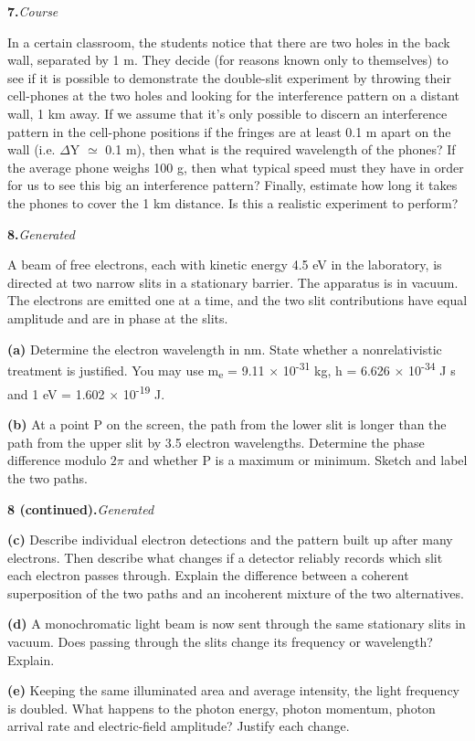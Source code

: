 \documentclass[12pt,letterpaper]{article}
\newcommand{\question}[2]{\noindent\textbf{#1.}\hfill\textit{#2}\par\medskip}
\begin{document}
\newpage

\question{7}{Course}

In a certain classroom, the students notice that there are two holes in the back wall, separated by 1 m. They decide (for reasons known only to themselves) to see if it is possible to demonstrate the double-slit experiment by throwing their cell-phones at the two holes and looking for the interference pattern on a distant wall, 1 km away. If we assume that it's only possible to discern an interference pattern in the cell-phone positions if the fringes are at least 0.1 m apart on the wall (i.e. \ensuremath{\Delta}Y \ensuremath{\simeq} 0.1 m), then what is the required wavelength of the phones? If the average phone weighs 100 g, then what typical speed must they have in order for us to see this big an interference pattern? Finally, estimate how long it takes the phones to cover the 1 km distance. Is this a realistic experiment to perform?


\newpage

\question{8}{Generated}

A beam of free electrons, each with kinetic energy 4.5 eV in the laboratory, is directed at two narrow slits in a stationary barrier. The apparatus is in vacuum. The electrons are emitted one at a time, and the two slit contributions have equal amplitude and are in phase at the slits.


\textbf{(a)} Determine the electron wavelength in nm. State whether a nonrelativistic treatment is justified. You may use m\textsubscript{e} = 9.11 \ensuremath{\times} 10\textsuperscript{-31} kg, h = 6.626 \ensuremath{\times} 10\textsuperscript{-34} J s and 1 eV = 1.602 \ensuremath{\times} 10\textsuperscript{-19} J.


\vfill

\textbf{(b)} At a point P on the screen, the path from the lower slit is longer than the path from the upper slit by 3.5 electron wavelengths. Determine the phase difference modulo \(2\pi\) and whether P is a maximum or minimum. Sketch and label the two paths.


\vfill

\newpage

\question{8 (continued)}{Generated}

\textbf{(c)} Describe individual electron detections and the pattern built up after many electrons. Then describe what changes if a detector reliably records which slit each electron passes through. Explain the difference between a coherent superposition of the two paths and an incoherent mixture of the two alternatives.


\vfill

\textbf{(d)} A monochromatic light beam is now sent through the same stationary slits in vacuum. Does passing through the slits change its frequency or wavelength? Explain.


\vfill

\textbf{(e)} Keeping the same illuminated area and average intensity, the light frequency is doubled. What happens to the photon energy, photon momentum, photon arrival rate and electric-field amplitude? Justify each change.


\vfill
\end{document}
